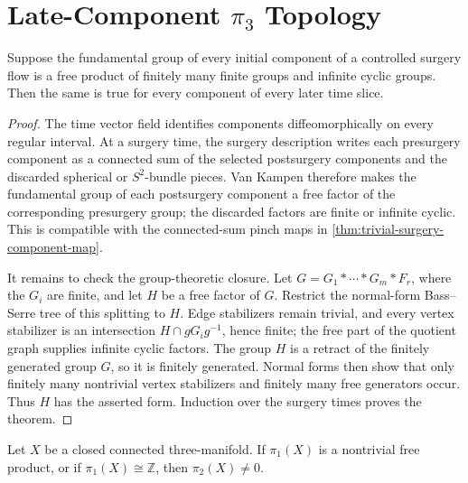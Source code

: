 \section{Late-Component \texorpdfstring{$\pi_3$}{pi3} Topology}

\begin{theorem}
\label{thm:component-fundamental-group-persistence}
\notready
Suppose the fundamental group of every initial component of a controlled
surgery flow is a free product of finitely many finite groups and infinite
cyclic groups.  Then the same is true for every component of every later
time slice.
\end{theorem}

\begin{proof}
The time vector field identifies components diffeomorphically on every
regular interval.  At a surgery time, the surgery description writes each
presurgery component as a connected sum of the selected postsurgery
components and the discarded spherical or $S^2$-bundle pieces.  Van Kampen
therefore makes the fundamental group of each postsurgery component a free
factor of the corresponding presurgery group; the discarded factors are
finite or infinite cyclic.  This is compatible with the connected-sum pinch
maps in \ref{thm:trivial-surgery-component-map}.

It remains to check the group-theoretic closure.  Let
$G=G_1*\cdots*G_m*F_r$, where the $G_i$ are finite, and let $H$ be a free
factor of $G$.  Restrict the normal-form Bass--Serre tree of this splitting
to $H$.  Edge stabilizers remain trivial, and every vertex stabilizer is an
intersection $H\cap gG_ig^{-1}$, hence finite; the free part of the quotient
graph supplies infinite cyclic factors.  The group $H$ is a retract of the
finitely generated group $G$, so it is finitely generated.  Normal forms then
show that only finitely many nontrivial vertex stabilizers and finitely many
free generators occur.  Thus $H$ has the asserted form.  Induction over the
surgery times proves the theorem.
\end{proof}

\begin{theorem}
\label{thm:free-product-pi2-obstruction}
\notready
Let $X$ be a closed connected three-manifold.  If $\pi_1(X)$ is a
nontrivial free product, or if $\pi_1(X)\cong\mathbb Z$, then
$\pi_2(X)\ne0$.
\end{theorem}

